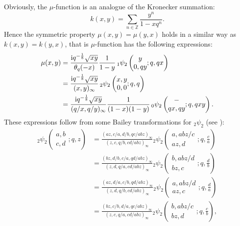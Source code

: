 \documentclass[pdftex]{sigma}
\numberwithin{equation}{section}
\theoremstyle{definition}
\newcommand{\Zz}{\mathbb{Z}}
\begin{document}
Obviously, the $\mu$-function is an analogue of the Kronecker summation:
\[
k(x,y)
 =
 \sum_{n\in\Zz}\frac{y^{n}}{1-xq^{n}}.
\]
Hence the symmetric property $\mu(x,y)=\mu(y,x)$ holds in a similar way as $k(x,y)=k(y,x)$, that is $\mu$-function has the following expressions:
\begin{align}
\label{eq:sym mu func 1}
\mu(x,y)
 &=
 \frac{{\rm i}q^{-\frac{1}{8}}\sqrt{xy}}{\theta_q(-x)}\frac{1}{1-y}
 \,{}_1\psi_2\left(\begin{matrix} y\\0,qy\end{matrix};q,qx\right) \\
\label{eq:sym mu func 2}
 &=
 \frac{{\rm i}q^{-\frac{1}{8}}\sqrt{xy}}{(x,y)_{\infty}}
 \, {}_2\psi_2\left(\begin{matrix}x,y\\0,0\end{matrix};q,q\right) \\
\label{eq:sym mu func 3}
 &=
 \frac{{\rm i}q^{-\frac{1}{8}}\sqrt{xy}}{(q/x,q/y)_{\infty}}\frac{1}{(1-x)(1-y)}
 \, {}_0\psi_2\left(\begin{matrix}-\\qx,qy\end{matrix};q,qxy\right).
\end{align}
These expressions follow from some Bailey transformations for ${_{2}\psi _2}$ (see \cite[p.~150, Exercise~5.20]{GR}):
\begin{align}
{_{2}\psi _2}\left(\begin{matrix}a,b \\ c,d \end{matrix};q,z\right)
\label{eq:Bailey trans0}
 &=
 \frac{(az,c/a,d/b,qc/abz)_{\infty}}{(z,c,q/b,cd/abz)_{\infty}}
 {_{2}\psi _2}\left(\begin{matrix}a,abz/c \\ az,d \end{matrix};q,\frac{c}{a}\right) \\
\label{eq:Bailey trans1}
 &=
 \frac{(bz,d/b,c/a,qd/abz)_{\infty}}{(z,d,q/a,cd/abz)_{\infty}}
 {_{2}\psi _2}\left(\begin{matrix}b,abz/d \\ bz,c \end{matrix};q,\frac{d}{b}\right) \\
\label{eq:Bailey trans2}
 &=
 \frac{(az,d/a,c/b,qd/abz)_{\infty}}{(z,d,q/b,cd/abz)_{\infty}}
 {_{2}\psi _2}\left(\begin{matrix}a,abz/d \\ az,c \end{matrix};q,\frac{d}{a}\right) \\
\label{eq:Bailey trans3}
 &=
 \frac{(bz,c/b,d/a,qc/abz)_{\infty}}{(z,c,q/a,cd/abz)_{\infty}}
 {_{2}\psi _2}\left(\begin{matrix}b,abz/c \\ bz,d \end{matrix};q,\frac{c}{b}\right),
\end{align}
\end{document}
